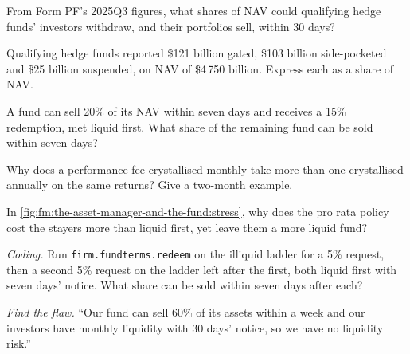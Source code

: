 \begin{exercise}[$\star$]\label{exo:fm:the-asset-manager-and-the-fund:2}
From Form PF's 2025Q3 figures, what shares of NAV could qualifying hedge funds' investors withdraw, and their portfolios sell, within 30 days?
\end{exercise}

\begin{exercise}[$\star$]\label{exo:fm:the-asset-manager-and-the-fund:3}
Qualifying hedge funds reported \$121 billion gated, \$103 billion side-pocketed and \$25 billion suspended, on NAV of \$4\,750 billion. Express each
as a share of NAV.
\end{exercise}

\begin{exercise}[$\star\star$]\label{exo:fm:the-asset-manager-and-the-fund:4}
A fund can sell 20\% of its NAV within seven days and receives a 15\% redemption, met liquid first. What share of the remaining fund can be sold
within seven days?
\end{exercise}

\begin{exercise}[$\star\star$]\label{exo:fm:the-asset-manager-and-the-fund:5}
Why does a performance fee crystallised monthly take more than one crystallised annually on the same returns? Give a two-month example.
\end{exercise}

\begin{exercise}[$\star\star$]\label{exo:fm:the-asset-manager-and-the-fund:6}
In \cref{fig:fm:the-asset-manager-and-the-fund:stress}, why does the pro rata policy cost the stayers more than liquid first, yet leave them a more
liquid fund?
\end{exercise}

\begin{exercise}[$\star\star\star$]\label{exo:fm:the-asset-manager-and-the-fund:7}
\emph{Coding.} Run \texttt{firm.fundterms.redeem} on the illiquid ladder for a 5\% request, then a second 5\% request on the ladder left after the
first, both liquid first with seven days' notice. What share can be sold within seven days after each?
\end{exercise}

\begin{exercise}[$\star\star\star$]\label{exo:fm:the-asset-manager-and-the-fund:8}
\emph{Find the flaw.} ``Our fund can sell 60\% of its assets within a week and our investors have monthly liquidity with 30 days' notice, so we
have no liquidity risk.''
\end{exercise}

